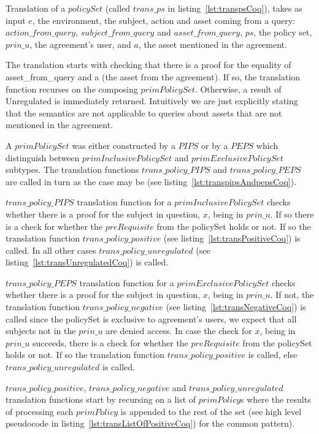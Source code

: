 Translation of a $policySet$ (called $trans\_ps$ in listing~\ref{lst:transpsCoq}), takes as input $e$, the environment, the subject, action and asset coming from a query: $action\_from\_query$, $subject\_from\_query$ and $asset\_from\_query$, $ps$, the policy set, $prin\_{u}$, the agreement's user, and $a$, the asset mentioned in the agreement. 

The translation starts with checking that there is a proof for the equality of asset_from_query and a (the asset from the agreement). If so, the translation function recurses on the composing $primPolicySet$. Otherwise, a result of Unregulated is immediately returned. Intuitively we are just explicitly stating that the semantics are not applicable to queries about assets that are not mentioned in the agreement. 

A $primPolicySet$ was either constructed by a $PIPS$ or by a $PEPS$ which distinguish between $primInclusivePolicySet$ and $primExclusivePolicySet$ subtypes. The translation functions $trans\_policy\_PIPS$ and $trans\_policy\_PEPS$ are called in turn as the case may be (see listing~\ref{lst:transpipsAndpepsCoq}).

$trans\_policy\_PIPS$ translation function for a $primInclusivePolicySet$ checks whether there is a proof for the subject in question, $x$, being in $prin\_u$. If so there is a check for whether the $preRequisite$ from the policySet holds or not. If so the translation function $trans\_policy\_positive$ (see listing~\ref{lst:transPositiveCoq}) is called. In all other cases $trans\_policy\_unregulated$ (see listing~\ref{lst:transUnregulatedCoq}) is called.

$trans\_policy\_PEPS$ translation function for a $primExclusivePolicySet$ checks whether there is a proof for the subject in question, $x$, being in $prin\_u$. If not, the translation function $trans\_policy\_negative$ (see listing~\ref{lst:transNegativeCoq}) is called since the policySet is exclusive to agreement's users, we expect that all subjects not in the $prin\_u$ are denied access. In case the check for $x$, being in $prin\_u$ succeeds, there is a check for whether the $preRequisite$ from the policySet holds or not. If so the translation function $trans\_policy\_positive$ is called, else $trans\_policy\_unregulated$ is called.

$trans\_policy\_positive$, $trans\_policy\_negative$ and $trans\_policy\_unregulated$ translation functions start by recursing on a list of $primPolicy$s where the results of processing each $primPolicy$ is appended to the rest of the set (see high level pseudocode in listing~\ref{lst:transListOfPositiveCoq}) for the common pattern). 

